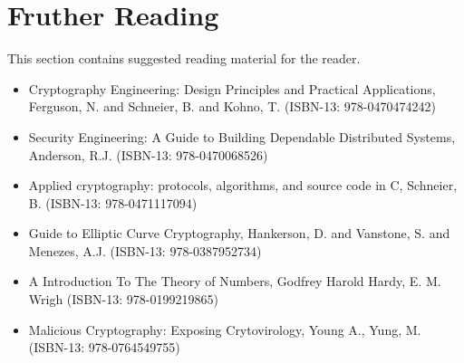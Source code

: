 \section{Fruther Reading}

This section contains suggested reading material for the reader.

\begin{itemize}
	\item Cryptography Engineering: Design Principles and Practical Applications, Ferguson, N. and Schneier, B. and Kohno, T. (ISBN-13: 978-0470474242)
	\item Security Engineering: A Guide to Building Dependable Distributed Systems, Anderson, R.J. (ISBN-13: 978-0470068526)
	\item Applied cryptography: protocols, algorithms, and source code in C, Schneier, B. (ISBN-13: 978-0471117094)
	\item Guide to Elliptic Curve Cryptography, Hankerson, D. and Vanstone, S. and Menezes, A.J. (ISBN-13: 978-0387952734)
	\item A Introduction To The Theory of Numbers, Godfrey Harold Hardy, E. M. Wrigh (ISBN-13: 978-0199219865)
	\item Malicious Cryptography: Exposing Crytovirology, Young A., Yung, M. (ISBN-13: 978-0764549755)
\end{itemize}

